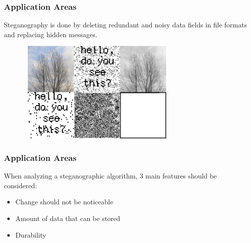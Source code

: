 \documentclass[12pt,hyperref={unicode}]{beamer}
\begin{document}
\begin{frame}
\frametitle{Application Areas}
Steganography is done by deleting redundant and noisy data fields in file formats and replacing hidden messages.\\
\begin{figure}
    \centering
    \includegraphics[width=8cm, height=5cm]{Embedding-Example.jpg}
   
    \label{}
\end{figure}
\end{frame}


\begin{frame}
\frametitle{Application Areas}
When analyzing a steganographic algorithm, 3 main features should be considered:\\
\begin{itemize}
    \item Change should not be noticeable
    \item Amount of data that can be stored
    \item Durability
\end{itemize}

\end{frame}
\end{document}
